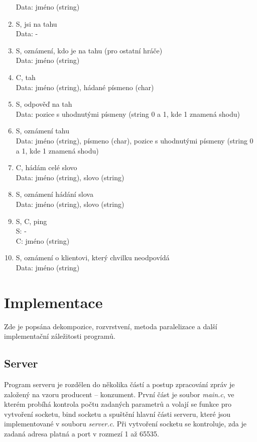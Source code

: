 \documentclass[12pt, a4paper]{article}
\begin{document}
\begin{enumerate}
		Data: jméno (string)
		\item S, jsi na tahu\\
		Data: -
		\item S, oznámení, kdo je na tahu (pro ostatní hráče)\\
		Data: jméno (string)
		\item C, tah\\
		Data: jméno (string), hádané písmeno (char)
		\item S, odpověď na tah\\
		Data: pozice s uhodnutými písmeny (string 0 a 1, kde 1 znamená shodu)
		\item S, oznámení tahu\\
		Data: jméno (string), písmeno (char), pozice s uhodnutými písmeny (string 0 a 1, kde 1 znamená shodu)
		\item C, hádám celé slovo\\
		Data: jméno (string), slovo (string)
		\item S, oznámení hádání slova\\
		Data: jméno (string), slovo (string)
		\item S, C, ping\\
		S: -\\
		C: jméno (string)
		\item S, oznámení o klientovi, který chvilku neodpovídá\\
		Data: jméno (string)
		\end{enumerate}
		
	\section{Implementace}
	Zde je popsána dekompozice, rozvrstvení, metoda paralelizace a další implementační záležitosti programů.
	
		\subsection{Server}
		Program serveru je rozdělen do několika částí a postup zpracování zpráv je založený na vzoru producent -- konzument. První část je soubor \emph{main.c}, ve kterém probíhá kontrola počtu zadaných parametrů a volají se funkce pro vytvoření socketu, bind socketu a spuštění hlavní části serveru, které jsou implementované v souboru \emph{server.c}. Při vytvoření socketu se kontroluje, zda je zadaná adresa platná a port v rozmezí 1 až 65535.
		
\end{document}
